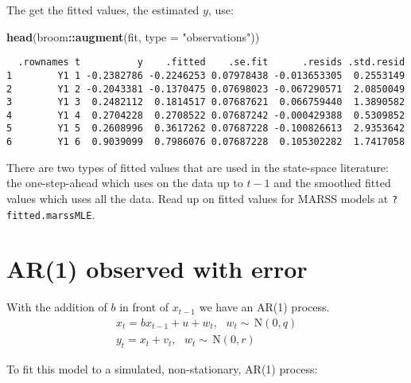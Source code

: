 \documentclass[12pt,]{book}
\newenvironment{Shaded}{\begin{snugshade}}{\end{snugshade}}
\newcommand{\DataTypeTok}[1]{\textcolor[rgb]{0.13,0.29,0.53}{#1}}
\newcommand{\KeywordTok}[1]{\textcolor[rgb]{0.13,0.29,0.53}{\textbf{#1}}}
\newcommand{\NormalTok}[1]{#1}
\newcommand{\OperatorTok}[1]{\textcolor[rgb]{0.81,0.36,0.00}{\textbf{#1}}}
\newcommand{\StringTok}[1]{\textcolor[rgb]{0.31,0.60,0.02}{#1}}
\begin{document}
The get the fitted values, the estimated \(y\), use:

\begin{Shaded}
\begin{Highlighting}[]
\KeywordTok{head}\NormalTok{(broom}\OperatorTok{::}\KeywordTok{augment}\NormalTok{(fit, }\DataTypeTok{type =} \StringTok{"observations"}\NormalTok{))}
\end{Highlighting}
\end{Shaded}

\begin{verbatim}
  .rownames t          y    .fitted    .se.fit      .resids .std.resid
1        Y1 1 -0.2382786 -0.2246253 0.07978438 -0.013653305  0.2553149
2        Y1 2 -0.2043381 -0.1370475 0.07698023 -0.067290571  2.0850049
3        Y1 3  0.2482112  0.1814517 0.07687621  0.066759440  1.3890582
4        Y1 4  0.2704228  0.2708522 0.07687242 -0.000429388  0.5309852
5        Y1 5  0.2608996  0.3617262 0.07687228 -0.100826613  2.9353642
6        Y1 6  0.9039099  0.7986076 0.07687228  0.105302282  1.7417058
\end{verbatim}

There are two types of fitted values that are used in the state-space literature: the one-step-ahead which uses on the data up to \(t-1\) and the smoothed fitted values which uses all the data. Read up on fitted values for MARSS models at \texttt{?fitted.marssMLE}.

\hypertarget{ar1-observed-with-error}{%
\section{AR(1) observed with error}\label{ar1-observed-with-error}}

With the addition of \(b\) in front of \(x_{t-1}\) we have an AR(1) process. \begin{gather}
x_{t} = bx_{t-1} + u + w_{t}, \text{ } w_t \sim \,\text{N}(0,q)  \\
y_{t} = x_{t} + v_{t}, \text{ } w_t \sim \,\text{N}(0,r)
\end{gather}

To fit this model to a simulated, non-stationary, AR(1) process: 
\end{document}
